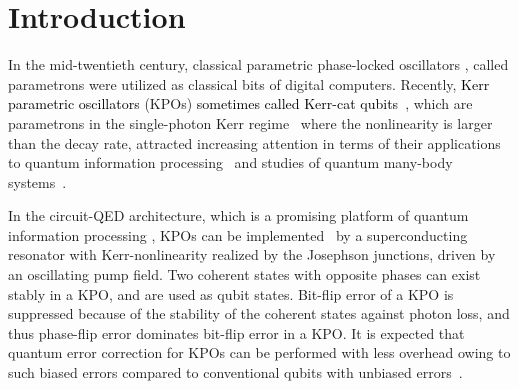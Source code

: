 \documentclass[%
 reprint,
 amsmath,amssymb,
 aps,
pra,
]{revtex4-2}
\begin{document}
\section{Introduction}
In the mid-twentieth century, classical parametric phase-locked oscillators \cite{Onyshkevych1959,Goto1959}, called parametrons were utilized as classical bits of digital computers.
Recently, \textcolor{black}{Kerr parametric oscillators} (KPOs) \textcolor{black}{sometimes called Kerr-cat qubits}~\cite{Milburn1991,Wielinga1993,Goto2016}, which are parametrons in the single-photon Kerr regime~\cite{Wang2019,Grimm2020} where the nonlinearity is larger than the decay rate, attracted increasing attention in terms of their applications to quantum information processing~\cite{Goto2019} and studies of quantum many-body systems~\cite{Dykman2018,Rota2019}.



In the circuit-QED architecture, which is a promising platform of quantum information processing \cite{You2005,Gambetta2017,Wendin2017,Krantz2019,Gu2019,Blais2020},
KPOs can be implemented~\cite{Meaney2014,Wang2019,Goto2019,Grimm2020} by a superconducting resonator with Kerr-nonlinearity realized by the Josephson junctions, driven by an oscillating pump field.
Two coherent states with opposite phases can exist stably in a KPO, and are used as qubit states.
Bit-flip error of a KPO is suppressed because of the stability of the coherent states against photon loss,
and thus phase-flip error dominates bit-flip error in a KPO.
It is expected that quantum error correction for KPOs can be performed with less overhead owing to such biased errors compared to conventional qubits with unbiased errors~\cite{Tuckett2019,Ataides2021}.
\end{document}
